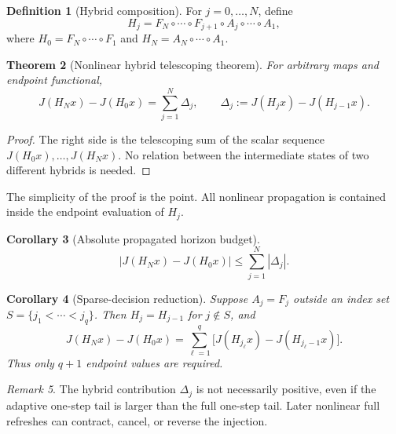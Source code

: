 \documentclass[11pt]{article}
\newtheorem{theorem}{Theorem}[section]
\newtheorem{corollary}[theorem]{Corollary}
\theoremstyle{definition}
\newtheorem{definition}[theorem]{Definition}
\theoremstyle{remark}
\newtheorem{remark}[theorem]{Remark}
\begin{document}
\begin{definition}[Hybrid composition]
For $j=0,\ldots,N$, define
\begin{equation}
 H_j=
 F_N\circ\cdots\circ F_{j+1}\circ
 A_j\circ\cdots\circ A_1,
 \label{eq:hybrid}
\end{equation}
where $H_0=F_N\circ\cdots\circ F_1$ and
$H_N=A_N\circ\cdots\circ A_1$.
\end{definition}

\begin{theorem}[Nonlinear hybrid telescoping theorem]
\label{thm:hybrid}
For arbitrary maps and endpoint functional,
\begin{equation}
 J(H_Nx)-J(H_0x)
 =\sum_{j=1}^N\Delta_j,
 \qquad
 \Delta_j:=J(H_jx)-J(H_{j-1}x).
 \label{eq:telescoping}
\end{equation}
\end{theorem}

\begin{proof}
The right side is the telescoping sum of the scalar sequence
$J(H_0x),\ldots,J(H_Nx)$.  No relation between the intermediate states of two
different hybrids is needed.
\end{proof}

The simplicity of the proof is the point.  All nonlinear propagation is
contained inside the endpoint evaluation of $H_j$.

\begin{corollary}[Absolute propagated horizon budget]
\label{cor:absolute}
\begin{equation}
 \left|J(H_Nx)-J(H_0x)\right|
 \le\sum_{j=1}^N|\Delta_j|.
 \label{eq:absolute}
\end{equation}
\end{corollary}

\begin{corollary}[Sparse-decision reduction]
\label{cor:sparse}
Suppose $A_j=F_j$ outside an index set
$S=\{j_1<\cdots<j_q\}$.  Then $H_j=H_{j-1}$ for $j\notin S$, and
\begin{equation}
 J(H_Nx)-J(H_0x)
 =\sum_{\ell=1}^q
 \bigl[J(H_{j_\ell}x)-J(H_{j_\ell-1}x)\bigr].
 \label{eq:sparse}
\end{equation}
Thus only $q+1$ endpoint values are required.
\end{corollary}

\begin{remark}
The hybrid contribution $\Delta_j$ is not necessarily positive, even if the
adaptive one-step tail is larger than the full one-step tail.  Later nonlinear
full refreshes can contract, cancel, or reverse the injection.
\end{remark}
\end{document}
